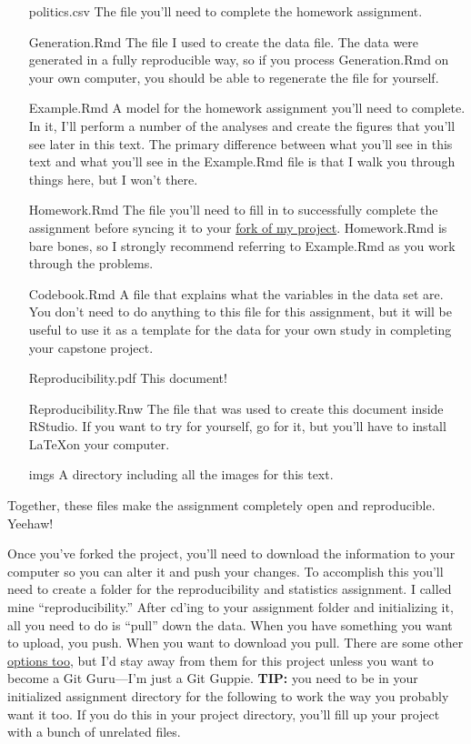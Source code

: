 \documentclass[12pt]{article}
\begin{document}
\begin{changemargin}{3.2cm}{0cm}
\begin{itemize}
\item [politics.csv] The file you'll need to complete the homework
assignment.
\item [Generation.Rmd] The file I used to create the data file.
The data were generated in a fully reproducible way, so if you process Generation.Rmd on your own
computer, you should be able to regenerate the file for yourself.
\item [Example.Rmd] A model for the homework assignment you'll
need to complete. In it, I'll perform a number of the analyses and create the figures that you'll see
later in this text. The primary difference between what you'll see in this text and what you'll see
in the Example.Rmd file is that I walk you through things here, but I won't there.
\item [Homework.Rmd] The file you'll need to fill in to successfully complete the assignment before
syncing it to your \href{https://github.com/knappsych/capstone-reproducibility}{fork of my project}.
Homework.Rmd is bare bones, so I strongly recommend referring to Example.Rmd as you work through the
problems.
\item [Codebook.Rmd] A file that explains what the variables
in the data set are. You don't need to do anything to this file for this assignment, but it will be
useful to use it as a template for the data for your own study in completing your capstone project.
\item [Reproducibility.pdf] This document!
\item [Reproducibility.Rnw] The file that was used to create this document
inside RStudio. If you want to try for yourself, go for it, but you'll have to install \LaTeX on your
computer.
\item [imgs] A directory including all the images for this text.
\end{itemize}
\end{changemargin}

Together, these files make the assignment completely open and reproducible. Yeehaw!

Once you've forked the project, you'll need to download the information to your computer so you can alter
it and push your changes. To accomplish this you'll need to create a folder for the reproducibility
and statistics assignment. I called mine ``reproducibility.'' After cd'ing to your assignment folder
and initializing it, all you need to do is ``pull'' down the data. When you have something you want
to upload, you push. When you want to download you pull. There are some other 
\href{http://longair.net/blog/2009/04/16/git-fetch-and-merge/}{options too}, but I'd
stay away from them for this project unless you want to become a Git Guru---I'm just a Git Guppie.
\textbf{TIP:} you need to be in your initialized assignment directory for the following to work the
way you probably want it too. If you do this in your project directory, you'll fill up your project
with a bunch of unrelated files.
\end{document}
